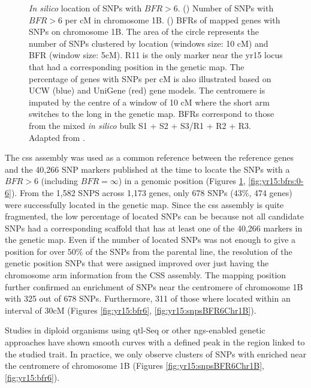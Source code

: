\begin{figure}
\caption[\textit{In silico} location of SNPs with BFR\textgreater6]{\textit{In silico} location of SNPs with $BFR>6$. () Number of SNPs with $BFR>6$ per cM in chromosome 1B. () BFRs of mapped genes with SNPs on chromosome 1B. The area of the circle represents the number of SNPs clustered by location (windows size: 10 cM) and BFR (window size: 5cM). R11 is the only marker near the \acrshort{yr15} locus that had a corresponding position in the genetic map. The percentage of genes with SNPs per cM is also illustrated based on UCW (blue) and UniGene (red) gene models. The centromere is imputed by the centre of a window of 10 cM where the short arm switches to the long in the genetic map. BFRs correspond to those from the mixed \textit{in silico} bulk S1 + S2 + S3/R1 + R2 + R3. Adapted from \citep{Ramirez-Gonzalez2015b}.} 
\label{fig:yr15:chr1}
\end{figure}

The \acrshort{css} assembly was used as a common reference between the reference genes and the 40,266 SNP markers published at the time \citep{Wang2014} to locate the SNPs with a $BFR>6$ (including $BFR=\infty$) in a genomic position (Figures \ref{fig:yr15:chr1}, \ref{fig:yr15:bfrs:0-6}).  
From the 1,582 SNPS across 1,173 genes,  only 678 SNPs ($43\%$, 474 genes) were successfully located in the genetic map. 
Since the \acrshort{css} assembly is quite fragmented, the low percentage of located SNPs can be because not all candidate SNPs had a corresponding scaffold that has at least one of the 40,266 markers in the genetic map. 
Even if the number of located SNPs was not enough to give a position for over $50\%$ of the SNPs from the parental line, the resolution of the genetic position SNPs that were assigned improved over just having the chromosome arm information from the CSS assembly. 
The mapping position further confirmed an enrichment of SNPs near the centromere of chromosome 1B with 325 out of 678 SNPs. 
Furthermore, 311 of those where located within an interval of 30cM (Figures \ref{fig:yr15:bfr6}, \ref{fig:yr15:snpsBFR6Chr1B}). 

Studies in diploid organisms using \acrshort{qtl}-Seq \citep{Takagi2013} or other \acrshort{ngs}-enabled genetic approaches \citep{James2013} have shown smooth curves with a defined peak in the region linked to the studied trait. 
In practice, we only observe clusters of SNPs with  enriched  near the centromere of chromosome 1B (Figures \ref{fig:yr15:snpsBFR6Chr1B}, \ref{fig:yr15:bfr6}). 

